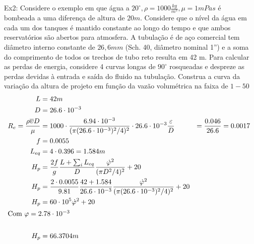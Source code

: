 Ex2: Considere o exemplo em que água a \(20^{\circ }, \rho = 1000 \frac{kg}{m^3}, \mu = 1 mPa s\) é
bombeada a uma diferença de altura de \(20 m\). Considere que o nível da água em cada um dos tanques
é mantido constante ao longo do tempo e que ambos reservatórios são abertos para atmosfera. A
tubulação é de aço comercial tem diâmetro interno constante de \(26,6 mm\)  (Sch. 40, diâmetro
nominal 1”) e a soma do comprimento de todos os trechos de tubo reto resulta em 42 m. Para calcular
as perdas de energia, considere 4 curvas longas de \(90^{\circ } \)  rosqueadas e despreze as perdas
devidas à entrada e saída do fluido na tubulação. Construa a curva da variação da altura de projeto
em função da vazão volumétrica na faixa de \(1-50\) 
\begin{align}
    L &= 42 m\\
    D &= 26.6 \cdot 10^{-3} \\
    R_e = \frac{\rho \overline{\upsilon} D}{\mu} &= 1000 \cdot \frac{6.94 \cdot 10^{-3}}{(\pi (26.6 \cdot 10^{-3})^2/4)^{2} } \cdot 26.6 \cdot 10^{-3} 
    \frac{\varepsilon}{D} &= \frac{0.046}{26.6} = 0.0017\\
    f &= 0.0055\\
    L_{eq} &= 4 \cdot 0.396 = 1.584 m\\
    H_p &= \frac{2f}{g} \frac{L + \sum_i L_{eq}}{D} \frac{\dot{\varphi}^2}{(\pi D^2/4)^2} + 20\\
    H_p &= \frac{2 \cdot 0.0055}{9.81} \frac{42 + 1.584}{26.6 \cdot 10^{-3} } \frac{\dot{\varphi}^2}{(\pi (26.6 \cdot 10^{-3})^2/4)^2} + 20\\
    H_p &= 60 \cdot 10^5 \dot{\varphi}^{2} + 20\\
    \intertext{Com \(\varphi  = 2.78 \cdot 10^{-3} \) }\\
    H_p &= 66.3704 m
\end{align}

